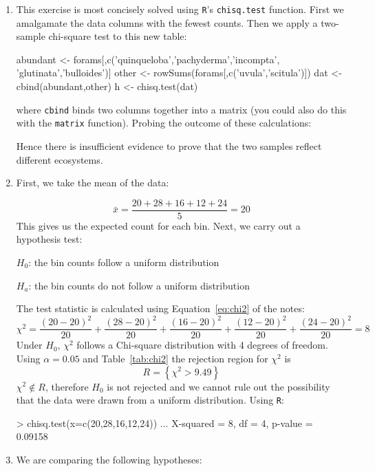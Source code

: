 \begin{enumerate}
\item This exercise is most concisely solved using \texttt{R}'s
  \texttt{chisq.test} function. First we amalgamate the data columns
  with the fewest counts. Then we apply a two-sample chi-square test
  to this new table:

\begin{script}
abundant <- forams[,c('quinqueloba','pachyderma','incompta',
                      'glutinata','bulloides')]
other <- rowSums(forams[,c('uvula','scitula')])
dat <- cbind(abundant,other)
h <- chisq.test(dat)
\end{script}

\noindent where \texttt{cbind} binds two columns together into a
matrix (you could also do this with the \texttt{matrix}
function). Probing the outcome of these calculations:


Hence there is insufficient evidence to prove that the two samples
reflect different ecosystems.

\item First, we take the mean of the data:

  \[
  \bar{x} = \frac{20 + 28 + 16 + 12 + 24}{5} = 20
  \]
  This gives us the expected count for each bin.  Next, we carry out a
  hypothesis test:

  $H_0$: the bin counts follow a uniform distribution

  $H_a$: the bin counts do not follow a uniform distribution

  The test statistic is calculated using Equation~\ref{eq:chi2} of the notes:
  \[
  \chi^2 = \frac{(20-20)^2}{20} + \frac{(28-20)^2}{20} + \frac{(16-20)^2}{20} +
  \frac{(12-20)^2}{20} + \frac{(24-20)^2}{20} = 8
  \]
  \noindent Under $H_0$, $\chi^2$ follows a Chi-square distribution
  with 4 degrees of freedom. Using $$ and
  Table~\ref{tab:chi2} the rejection region for $\chi^2$ is
  \[
  R = \left\{\chi^2>9.49\right\}
  \]
  \noindent$\chi^2 \notin R$, therefore $H_0$ is not rejected and we
  cannot rule out the possibility that the data were drawn from a
  uniform distribution. Using \texttt{R}:

\begin{console}
> chisq.test(x=c(20,28,16,12,24))
...
X-squared = 8, df = 4, p-value = 0.09158
\end{console}

\item We are comparing the following hypotheses:
  

\end{enumerate}
